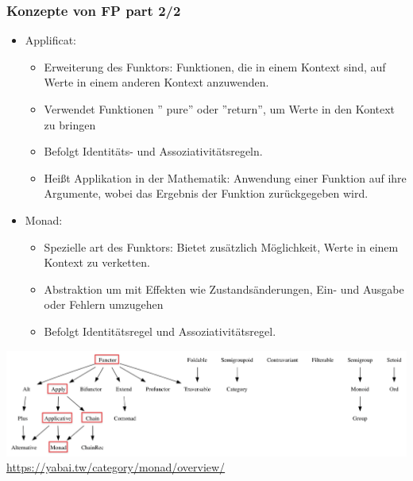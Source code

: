 \documentclass{beamer}
\begin{document}
\begin{frame}
\frametitle{Konzepte  von FP part 2/2} 
	\begin{itemize}
	    \item Applificat: 
	\begin{itemize}
		\item Erweiterung des Funktors: Funktionen, die in einem Kontext sind, auf Werte in einem anderen Kontext anzuwenden.
		\item Verwendet Funktionen   '' pure'' oder  ''return'', um Werte in den Kontext zu bringen
		\item Befolgt Identitäts- und Assoziativitätsregeln.
		\item Heißt Applikation in der Mathematik:  Anwendung einer Funktion auf ihre Argumente, wobei das Ergebnis der Funktion zurückgegeben wird. 
	\end{itemize}
	\item Monad: \begin{itemize}
		\item  Spezielle art des Funktors: Bietet zusätzlich Möglichkeit, Werte in einem Kontext zu verketten.
		\item Abstraktion um mit Effekten wie Zustandsänderungen, Ein- und Ausgabe oder Fehlern umzugehen 
		\item Befolgt Identitätsregel und Assoziativitätsregel.
	\end{itemize}
	\end{itemize}
\end{frame}

\begin{frame}
	\centering
\includegraphics[scale=0.25]{bilder/monad000.png}
\textmd{\tiny \url{https://yabai.tw/category/monad/overview/}}
\end{frame}
\end{document}
